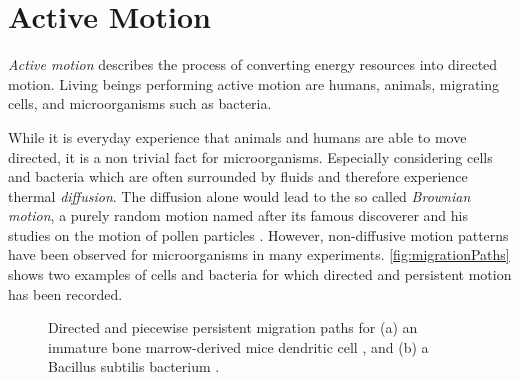 \chapter{Active Motion}\label{ch:activeMotion}
\textit{Active motion} describes the process of converting energy resources into directed motion. Living beings performing active motion are \eg humans, animals, migrating cells, and microorganisms such as bacteria.

While it is everyday experience that animals and humans are able to move directed, it is a non trivial fact for microorganisms. Especially considering cells and bacteria which are often surrounded by fluids and therefore experience thermal \textit{diffusion}. The diffusion alone would lead to the so called \textit{Brownian motion}, a purely random motion named after its famous discoverer \citeauthor{brown:1828} and his studies on the motion of pollen particles \cite{brown:1828}. However, non-diffusive motion patterns have been observed for microorganisms in many experiments. \autoref{fig:migrationPaths} shows two examples of cells and bacteria for which directed and persistent motion has been recorded.

\begin{figure}[bth]
    \myfloatalign
     \quad
    \caption[Directed, persistent migration paths]{Directed and piecewise persistent migration paths for (a) an immature bone marrow-derived mice dendritic cell \cite{maiuri:2015}, and (b) a Bacillus subtilis bacterium \cite{najafi:2018}.}\label{fig:migrationPaths}
\end{figure}

